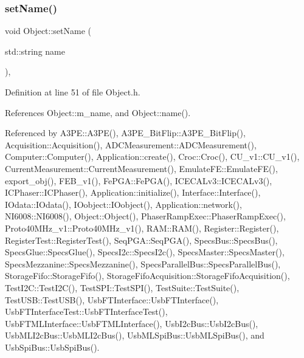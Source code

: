 \subsubsection{\texorpdfstring{set\+Name()}{setName()}}
{\footnotesize\ttfamily void Object\+::set\+Name (\begin{DoxyParamCaption}\item[{std\+::string}]{name }\end{DoxyParamCaption})\hspace{0.3cm}{\ttfamily [inline]}, {\ttfamily [inherited]}}



Definition at line 51 of file Object.\+h.



References Object\+::m\+\_\+name, and Object\+::name().



Referenced by A3\+P\+E\+::\+A3\+P\+E(), A3\+P\+E\+\_\+\+Bit\+Flip\+::\+A3\+P\+E\+\_\+\+Bit\+Flip(), Acquisition\+::\+Acquisition(), A\+D\+C\+Measurement\+::\+A\+D\+C\+Measurement(), Computer\+::\+Computer(), Application\+::create(), Croc\+::\+Croc(), C\+U\+\_\+v1\+::\+C\+U\+\_\+v1(), Current\+Measurement\+::\+Current\+Measurement(), Emulate\+F\+E\+::\+Emulate\+F\+E(), export\+\_\+obj(), F\+E\+B\+\_\+v1(), Fe\+P\+G\+A\+::\+Fe\+P\+G\+A(), I\+C\+E\+C\+A\+Lv3\+::\+I\+C\+E\+C\+A\+Lv3(), I\+C\+Phaser\+::\+I\+C\+Phaser(), Application\+::initialize(), Interface\+::\+Interface(), I\+Odata\+::\+I\+Odata(), I\+Oobject\+::\+I\+Oobject(), Application\+::network(), N\+I6008\+::\+N\+I6008(), Object\+::\+Object(), Phaser\+Ramp\+Exec\+::\+Phaser\+Ramp\+Exec(), Proto40\+M\+Hz\+\_\+v1\+::\+Proto40\+M\+Hz\+\_\+v1(), R\+A\+M\+::\+R\+A\+M(), Register\+::\+Register(), Register\+Test\+::\+Register\+Test(), Seq\+P\+G\+A\+::\+Seq\+P\+G\+A(), Specs\+Bus\+::\+Specs\+Bus(), Specs\+Glue\+::\+Specs\+Glue(), Specs\+I2c\+::\+Specs\+I2c(), Specs\+Master\+::\+Specs\+Master(), Specs\+Mezzanine\+::\+Specs\+Mezzanine(), Specs\+Parallel\+Bus\+::\+Specs\+Parallel\+Bus(), Storage\+Fifo\+::\+Storage\+Fifo(), Storage\+Fifo\+Acquisition\+::\+Storage\+Fifo\+Acquisition(), Test\+I2\+C\+::\+Test\+I2\+C(), Test\+S\+P\+I\+::\+Test\+S\+P\+I(), Test\+Suite\+::\+Test\+Suite(), Test\+U\+S\+B\+::\+Test\+U\+S\+B(), Usb\+F\+T\+Interface\+::\+Usb\+F\+T\+Interface(), Usb\+F\+T\+Interface\+Test\+::\+Usb\+F\+T\+Interface\+Test(), Usb\+F\+T\+M\+L\+Interface\+::\+Usb\+F\+T\+M\+L\+Interface(), Usb\+I2c\+Bus\+::\+Usb\+I2c\+Bus(), Usb\+M\+L\+I2c\+Bus\+::\+Usb\+M\+L\+I2c\+Bus(), Usb\+M\+L\+Spi\+Bus\+::\+Usb\+M\+L\+Spi\+Bus(), and Usb\+Spi\+Bus\+::\+Usb\+Spi\+Bus().


